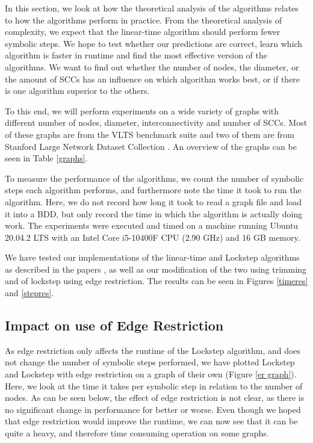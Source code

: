 \documentclass[../master/master.tex]{subfiles}
\begin{document}
In this section, we look at how the theoretical analysis of the algorithms relates to how the algorithms perform in practice. From the theoretical analysis of complexity, we expect that the linear-time algorithm should perform fewer symbolic steps. We hope to test whether our predictions are correct, learn which algorithm is faster in runtime and find the most effective version of the algorithms. We want to find out whether the number of nodes, the diameter, or the amount of SCCs has an influence on which algorithm works best, or if there is one algorithm superior to the others.

To this end, we will perform experiments on a wide variety of graphs with different number of nodes, diameter, interconnectivity and number of SCCs. Most of these graphs are from the VLTS benchmark suite \cite{vlts} and two of them are from Stanford Large Network Dataset Collection \cite{snapnets}. An overview of the graphs can be seen in Table \ref{graphs}. 

To measure the performance of the algorithms, we count the number of symbolic steps each algorithm performs, and furthermore note the time it took to run the algorithm. Here, we do not record how long it took to read a graph file and load it into a BDD, but only record the time in which the algorithm is actually doing work. The experiments were executed and timed on a machine running Ubuntu 20.04.2 LTS with an Intel Core i5-10400F CPU (2.90 GHz) and 16 GB memory.

We have tested our implementations of the linear-time and Lockstep algorithms as described in the papers \cite{linear}\cite{lockstep}, as well as our modification of the two using trimming and of lockstep using edge restriction. The results can be seen in Figures \ref{timeres} and \ref{stepres}.

\subsection{Impact on use of Edge Restriction}
As edge restriction only affects the runtime of the Lockstep algorithm, and does not change the number of symbolic steps performed, we have plotted Lockstep and Lockstep with edge restriction on a graph of their own (Figure \ref{er graph}). Here, we look at the time it takes per symbolic step in relation to the number of nodes. As can be seen below, the effect of edge restriction is not clear, as there is no significant change in performance for better or worse. Even though we hoped that edge restriction would improve the runtime, we can now see that it can be quite a heavy, and therefore time consuming operation on some graphs.
\end{document}
